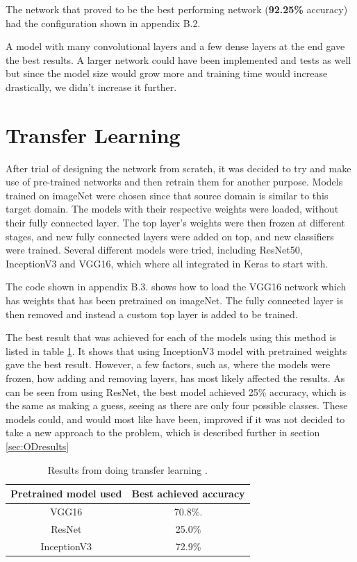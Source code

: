 The network that proved to be the best performing network (\textbf{92.25\%} accuracy) had the configuration shown in appendix B.2.

A model with many convolutional layers and a few dense layers at the end gave the best
results. A larger network could have been implemented and tests as well but
since the model size would grow more and training time would increase drastically,
we didn't increase it further.

\section{Transfer Learning}
\label{sec:NNtransfer}
After trial of designing the network from scratch, it was decided to try and make use of 
pre-trained networks and then retrain them for another purpose. Models trained on 
imageNet \cite{imageNet} were chosen since that source domain is similar to this target 
domain. The models with their respective weights were loaded, without their fully 
connected layer. The top layer's weights were then frozen at different stages, and new 
fully connected layers were added on top, and new classifiers were trained. 
Several different models were tried, including ResNet50, InceptionV3 and VGG16, 
which where all integrated in Keras to start with.

The code shown in appendix B.3. shows how to load the VGG16 network which has weights that has been pretrained on imageNet. The fully connected layer is then removed and instead a custom top layer is added to be trained.

The best result  that was achieved for each of the models using this method is listed in
 table \ref{table:transferLearning}. It shows that using InceptionV3 model with pretrained
 weights gave the best result. However, a few factors, such as, where the models were
 frozen, how adding and removing layers, has most likely affected the results. As can be
 seen from using ResNet, the best model achieved 25\% accuracy, which is the same as making a guess, seeing as there are only four possible classes. These models could, and would most like have been, improved if it was not decided to take a new approach to the problem, which is described further in section \ref{sec:ODresults}

\begin{table}[h]
\centering
\begin{tabular}{ |c|c| } 
 \hline
 Pretrained model used &  Best achieved accuracy  \\ 
 \hline
 VGG16 & 70.8\%. \\ 
 \hline
 ResNet & 25.0\% \\ 
  \hline
 InceptionV3 & 72.9\% \\ 
 \hline
\end{tabular}
\caption{Results from doing transfer learning .}
\label{table:transferLearning}
\end{table}


\newpage